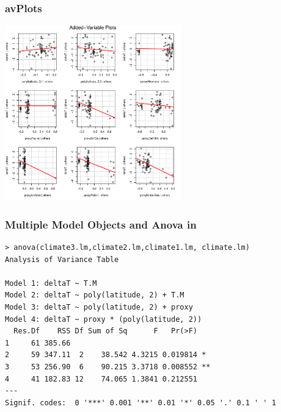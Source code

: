 \documentclass[]{beamer}
\begin{document}
\begin{frame}%
   \frametitle{avPlots}
 \centerline{\includegraphics[height=3in]{avplot}}
 \end{frame}
\begin{frame}[fragile]
  \frametitle{Multiple Model Objects and Anova in \R}
\begin{verbatim}
> anova(climate3.lm,climate2.lm,climate1.lm, climate.lm)
Analysis of Variance Table

Model 1: deltaT ~ T.M
Model 2: deltaT ~ poly(latitude, 2) + T.M
Model 3: deltaT ~ poly(latitude, 2) + proxy
Model 4: deltaT ~ proxy * (poly(latitude, 2))
  Res.Df    RSS Df Sum of Sq      F   Pr(>F)   
1     61 385.66                                
2     59 347.11  2    38.542 4.3215 0.019814 * 
3     53 256.90  6    90.215 3.3718 0.008552 **
4     41 182.83 12    74.065 1.3841 0.212551   
---
Signif. codes:  0 '***' 0.001 '**' 0.01 '*' 0.05 '.' 0.1 ' ' 1 
\end{verbatim}
\end{frame}
\end{document}
